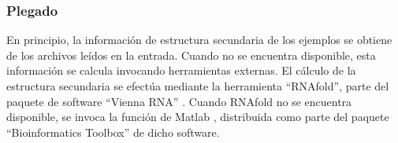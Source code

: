 %
\subsubsection{Plegado}
%
En principio, la información de estructura secundaria de los ejemplos
se obtiene de los archivos leídos en la entrada.
Cuando no se encuentra disponible, esta información se calcula
invocando herramientas externas.
El cálculo de la estructura secundaria se efectúa mediante la
herramienta ``RNAfold'', parte del paquete de software ``Vienna RNA''
\cite{vienna}.
Cuando RNAfold no se encuentra disponible, se invoca la función de
Matlab , distribuida como parte del paquete
``Bioinformatics Toolbox'' de dicho software.
